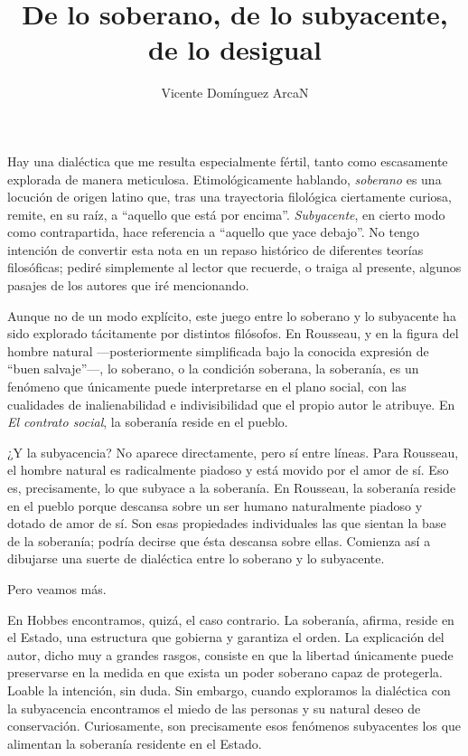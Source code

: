 \documentclass[11pt,a4paper]{article}
\title{\textbf{De lo soberano, de lo subyacente, de lo desigual}}
\author{Vicente Domínguez ArcaN}
\date{}
\begin{document}
\maketitle

Hay una dialéctica que me resulta especialmente fértil, tanto como escasamente explorada de manera meticulosa. Etimológicamente hablando, \emph{soberano} es una locución de origen latino que, tras una trayectoria filológica ciertamente curiosa, remite, en su raíz, a ``aquello que está por encima''. \emph{Subyacente}, en cierto modo como contrapartida, hace referencia a ``aquello que yace debajo''. No tengo intención de convertir esta nota en un repaso histórico de diferentes teorías filosóficas; pediré simplemente al lector que recuerde, o traiga al presente, algunos pasajes de los autores que iré mencionando.

Aunque no de un modo explícito, este juego entre lo soberano y lo subyacente ha sido explorado tácitamente por distintos filósofos. En Rousseau, y en la figura del hombre natural ---posteriormente simplificada bajo la conocida expresión de ``buen salvaje''---, lo soberano, o la condición soberana, la soberanía, es un fenómeno que únicamente puede interpretarse en el plano social, con las cualidades de inalienabilidad e indivisibilidad que el propio autor le atribuye. En \emph{El contrato social}, la soberanía reside en el pueblo.

¿Y la subyacencia? No aparece directamente, pero sí entre líneas. Para Rousseau, el hombre natural es radicalmente piadoso y está movido por el amor de sí. Eso es, precisamente, lo que subyace a la soberanía. En Rousseau, la soberanía reside en el pueblo porque descansa sobre un ser humano naturalmente piadoso y dotado de amor de sí. Son esas propiedades individuales las que sientan la base de la soberanía; podría decirse que ésta descansa sobre ellas. Comienza así a dibujarse una suerte de dialéctica entre lo soberano y lo subyacente.

Pero veamos más.

En Hobbes encontramos, quizá, el caso contrario. La soberanía, afirma, reside en el Estado, una estructura que gobierna y garantiza el orden. La explicación del autor, dicho muy a grandes rasgos, consiste en que la libertad únicamente puede preservarse en la medida en que exista un poder soberano capaz de protegerla. Loable la intención, sin duda. Sin embargo, cuando exploramos la dialéctica con la subyacencia encontramos el miedo de las personas y su natural deseo de conservación. Curiosamente, son precisamente esos fenómenos subyacentes los que alimentan la soberanía residente en el Estado.
\end{document}
